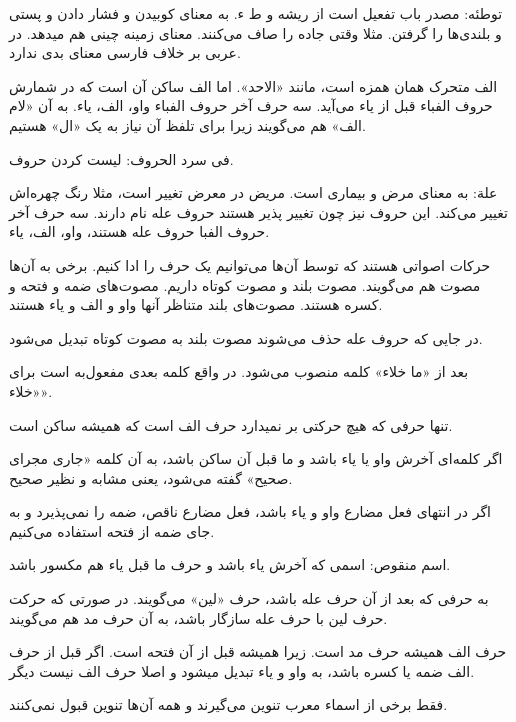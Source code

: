 \documentclass{article}
\begin{document}
\begin{addpage}{2}
    \vspace*{0.3cm}
    \begin{note}
      توطئه: مصدر باب تفعیل است از ریشه و ط ء.
      به معنای کوبیدن و فشار دادن و پستی و بلندی‌ها را گرفتن. مثلا وقتی جاده را صاف می‌کنند. معنای زمینه چینی هم میدهد. در عربی بر خلاف فارسی معنای بدی ندارد.
     \end{note}
    \begin{note}
      الف متحرک همان همزه است، مانند «الاحد». اما الف ساکن آن است که در شمارش حروف الفباء قبل از یاء می‌آید. سه حرف آخر حروف الفباء
واو، الف، یاء. به آن «لام الف» هم می‌گویند زیرا برای تلفظ آن نیاز به یک «ال» هستیم.
    \end{note}
    \begin{note}
      فی سرد الحروف: لیست کردن حروف.
    \end{note}
    \begin{note}
      علة: به معنای مرض و بیماری است. مریض در معرض تغییر است، مثلا رنگ چهره‌اش تغییر می‌کند. این حروف نیز چون تغییر پذیر هستند حروف عله نام دارند.
سه حرف آخر حروف الفبا حروف عله هستند، واو، الف، یاء.
    \end{note}
    \begin{note}
      حرکات اصواتی هستند که توسط آن‌ها می‌توانیم یک حرف را ادا کنیم. برخی به آن‌ها مصوت هم می‌گویند. مصوت بلند و مصوت کوتاه داریم. مصوت‌های ضمه و فتحه و کسره هستند.
مصوت‌های بلند متناظر آنها واو و الف و یاء هستند.

      در جایی که حروف عله حذف می‌شوند مصوت بلند به مصوت کوتاه تبدیل می‌شود.
    \end{note}
    \begin{note}
      بعد از «ما خلاء» کلمه منصوب می‌شود. در واقع کلمه بعدی مفعول‌به است برای «خلاء».
      
      تنها حرفی که هیچ حرکتی بر نمیدارد حرف الف است که همیشه ساکن است.
    \end{note}
    \begin{note}
      اگر کلمه‌ای آخرش واو یا یاء باشد و ما قبل آن ساکن باشد، به آن کلمه «جاری مجرای صحیح» گفته می‌شود، یعنی مشابه و نظیر صحیح.

      اگر در انتهای فعل مضارع واو و یاء باشد، فعل مضارع ناقص، ضمه را نمی‌پذیرد و به جای ضمه از فتحه استفاده می‌کنیم.

      اسم منقوص: اسمی که آخرش یاء باشد و حرف ما قبل یاء هم مکسور باشد.
    \end{note}
    \begin{note}
به حرفی که بعد از آن حرف عله باشد، حرف «لین» می‌گویند. در صورتی که حرکت حرف لین با حرف عله سازگار باشد، به آن حرف مد هم می‌گویند.
    \end{note}
    \begin{note}
حرف الف همیشه حرف مد است. زیرا همیشه قبل از آن فتحه است. اگر قبل از حرف الف ضمه یا کسره باشد، به واو و یاء تبدیل میشود و اصلا حرف الف نیست دیگر.
    \end{note}
    \vspace*{2cm}
    \begin{note}
      فقط برخی از اسماء معرب تنوین می‌گیرند و همه آن‌ها تنوین قبول نمی‌کنند.
    \end{note}
\end{addpage}
\end{document}
